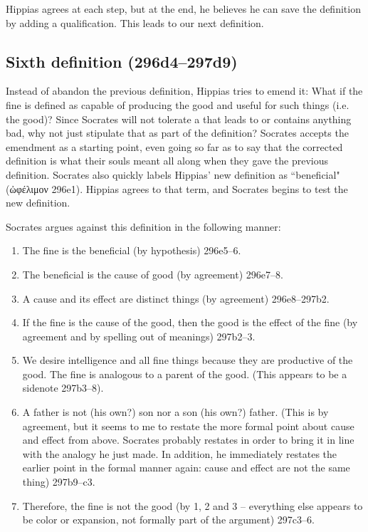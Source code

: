 \documentclass[11pt]{article}
\begin{document}
Hippias agrees at each step, but at the end, he believes he can save the
definition by adding a qualification.  This leads to our next definition.


\subsection{Sixth definition (296d4--297d9)}

Instead of abandon the previous definition, Hippias tries to emend it: What
if the fine is defined as capable of producing the good and useful for such
things (i.e. the good)?  Since Socrates will not tolerate
a  that leads to or contains anything bad, why not just
stipulate that as part of the definition?  Socrates accepts the emendment
as a starting point, even going so far as to say that the corrected
definition is what their souls meant all along when they gave the previous
definition.  Socrates also quickly labels Hippias' new definition as
``beneficial" ({\g ὠφέλιμον} 296e1).  Hippias agrees to that term, and
Socrates begins to test the new definition.

Socrates argues against this definition in the following manner:

\begin{enumerate}

    \item The fine is the beneficial (by hypothesis) 296e5--6.

    \item The beneficial is the cause of good (by agreement) 296e7--8.

    \item A cause and its effect are distinct things (by agreement)
        296e8--297b2.

    \item If the fine is the cause of the good, then the good is the effect
        of the fine (by agreement and by spelling out of meanings)
        297b2--3.

    \item We desire intelligence and all fine things because they are
        productive of the good.  The fine is analogous to a parent of the
        good.  (This appears to be a sidenote 297b3--8).

    \item A father is not (his own?) son nor a son (his own?) father. (This
        is by agreement, but it seems to me to restate the more formal
        point about cause and effect from above.  Socrates probably
        restates in order to bring it in line with the analogy he just
        made.  In addition, he immediately restates the earlier point in
        the formal manner again: cause and effect are not the same thing)
        297b9--c3.

    \item Therefore, the fine is not the good (by 1, 2 and 3 -- everything
        else appears to be color or expansion, not formally part of the
        argument) 297c3--6.

\end{enumerate}
\end{document}
